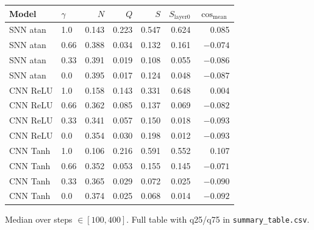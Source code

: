 \documentclass{article}
\begin{document}
\begin{center}
\small
\begin{tabular}{@{}llrrrrr@{}}
\toprule
Model & $\gamma$ & $N$ & $Q$ & $S$ & $S_{\text{layer0}}$ & $\cos_{\text{mean}}$ \\
\midrule
SNN atan     & 1.0  & 0.143 & 0.223 & 0.547 & 0.624 & 0.085 \\
SNN atan     & 0.66 & 0.388 & 0.034 & 0.132 & 0.161 & $-0.074$ \\
SNN atan     & 0.33 & 0.391 & 0.019 & 0.108 & 0.055 & $-0.086$ \\
SNN atan     & 0.0  & 0.395 & 0.017 & 0.124 & 0.048 & $-0.087$ \\
\addlinespace
CNN ReLU     & 1.0  & 0.158 & 0.143 & 0.331 & 0.648 & 0.004 \\
CNN ReLU     & 0.66 & 0.362 & 0.085 & 0.137 & 0.069 & $-0.082$ \\
CNN ReLU     & 0.33 & 0.341 & 0.057 & 0.150 & 0.018 & $-0.093$ \\
CNN ReLU     & 0.0  & 0.354 & 0.030 & 0.198 & 0.012 & $-0.093$ \\
\addlinespace
CNN Tanh     & 1.0  & 0.106 & 0.216 & 0.591 & 0.552 & 0.107 \\
CNN Tanh     & 0.66 & 0.352 & 0.053 & 0.155 & 0.145 & $-0.071$ \\
CNN Tanh     & 0.33 & 0.365 & 0.029 & 0.072 & 0.025 & $-0.090$ \\
CNN Tanh     & 0.0  & 0.374 & 0.025 & 0.068 & 0.014 & $-0.092$ \\
\bottomrule
\end{tabular}
\end{center}
Median over steps $\in[100,400]$. Full table with q25/q75 in \texttt{summary\_table.csv}.
\end{document}
